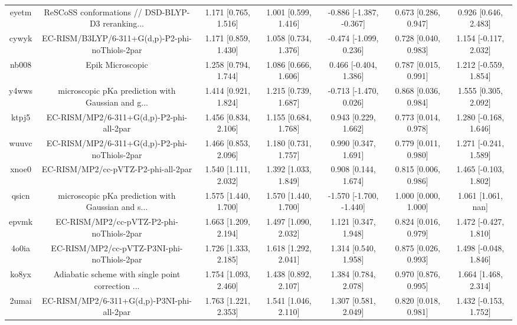 \documentclass{article}
\begin{document}
\begin{center}
\begin{longtable}{|ccccccc|}
 eyetm &  ReSCoSS conformations // DSD-BLYP-D3 reranking... &     1.171 [0.765, 1.516] &     1.001 [0.599, 1.416] &  -0.886 [-1.387, -0.367] &  0.673 [0.286, 0.947] &    0.926 [0.646, 2.483] \\
 cywyk &    EC-RISM/B3LYP/6-311+G(d,p)-P2-phi-noThiols-2par &     1.171 [0.859, 1.430] &     1.058 [0.734, 1.376] &   -0.474 [-1.099, 0.236] &  0.728 [0.040, 0.983] &   1.154 [-0.117, 2.032] \\
 nb008 &                                   Epik Microscopic &     1.258 [0.794, 1.744] &     1.086 [0.666, 1.606] &    0.466 [-0.404, 1.386] &  0.787 [0.015, 0.991] &   1.212 [-0.559, 1.854] \\
 y4wws &  microscopic pKa prediction with Gaussian and g... &     1.414 [0.921, 1.824] &     1.215 [0.739, 1.687] &   -0.713 [-1.470, 0.026] &  0.868 [0.036, 0.984] &    1.555 [0.305, 2.092] \\
 ktpj5 &           EC-RISM/MP2/6-311+G(d,p)-P2-phi-all-2par &     1.456 [0.834, 2.106] &     1.155 [0.684, 1.768] &     0.943 [0.229, 1.662] &  0.773 [0.014, 0.978] &   1.280 [-0.168, 1.646] \\
 wuuvc &      EC-RISM/MP2/6-311+G(d,p)-P2-phi-noThiols-2par &     1.466 [0.853, 2.096] &     1.180 [0.731, 1.757] &     0.990 [0.347, 1.691] &  0.779 [0.011, 0.980] &   1.271 [-0.241, 1.589] \\
 xnoe0 &                EC-RISM/MP2/cc-pVTZ-P2-phi-all-2par &     1.540 [1.111, 2.032] &     1.392 [1.033, 1.849] &     0.908 [0.144, 1.674] &  0.815 [0.006, 0.986] &   1.465 [-0.103, 1.802] \\
 qsicn &  microscopic pKa prediction with Gaussian and s... &     1.575 [1.440, 1.700] &     1.570 [1.440, 1.700] &  -1.570 [-1.700, -1.440] &  1.000 [0.000, 1.000] &      1.061 [1.061, nan] \\
 epvmk &           EC-RISM/MP2/cc-pVTZ-P2-phi-noThiols-2par &     1.663 [1.209, 2.194] &     1.497 [1.090, 2.032] &     1.121 [0.347, 1.948] &  0.824 [0.016, 0.979] &   1.472 [-0.427, 1.810] \\
 4o0ia &         EC-RISM/MP2/cc-pVTZ-P3NI-phi-noThiols-2par &     1.726 [1.333, 2.185] &     1.618 [1.292, 2.041] &     1.314 [0.540, 1.958] &  0.875 [0.026, 0.993] &   1.498 [-0.048, 1.846] \\
 ko8yx &  Adiabatic scheme with single point correction ... &     1.754 [1.093, 2.460] &     1.438 [0.892, 2.107] &     1.384 [0.784, 2.078] &  0.970 [0.876, 0.995] &    1.664 [1.468, 2.314] \\
 2umai &         EC-RISM/MP2/6-311+G(d,p)-P3NI-phi-all-2par &     1.763 [1.221, 2.353] &     1.541 [1.046, 2.110] &     1.307 [0.581, 2.049] &  0.820 [0.018, 0.981] &   1.432 [-0.153, 1.752] \\

\end{longtable}
\end{center}
\end{document}
